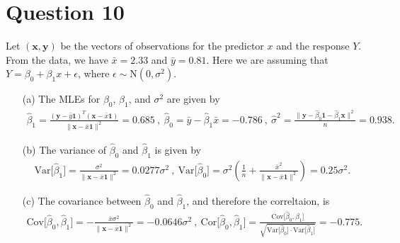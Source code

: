 \documentclass[10pt]{article}
\begin{document}
\section{Question 10} \noindent
Let \((\mathbf{x}, \mathbf{y})\) be the vectors of observations for the predictor \(x\) and the response \(Y\). 
From the data, we have \(\bar{x} = 2.33\) and \(\bar{y} = 0.81\).
Here we are assuming that \(Y = \beta_0 + \beta_1 x + \epsilon\), where \(\epsilon \sim \mathrm{N}(0, \sigma^2)\).
\begin{itemize}
    \item[(a)] The MLEs for \(\beta_0\), \(\beta_1\), and \(\sigma^2\) are given by 
    \begin{align*}
        \hat{\beta}_{1}
        = \frac{(\mathbf{y} - \bar{y}\mathbf{1})^T(\mathbf{x} - \bar{x}\mathbf{1})}{\| \mathbf{x} - \bar{x}\mathbf{1} \|^2}
        = 0.685
        ~,~
        \hat{\beta}_0
        = \bar{y} - \hat{\beta}_1 \bar{x}
        = -0.786
        ~,~
        \hat{\sigma}^2
        = \frac{\| \mathbf{y} - \hat{\beta}_0 \mathbf{1} - \hat{\beta}_1 \mathbf{x} \|^2}{n}
        = 0.938.
    \end{align*}
    \item[(b)] The variance of \(\hat{\beta}_0\) and \(\hat{\beta}_1\) is given by 
    \begin{align*}
        \mathrm{Var}\big[ \hat{\beta}_1 \big]
        = \frac{\sigma^2}{\| \mathbf{x} - \bar{x}\mathbf{1} \|^2}
        = 0.0277 \sigma^2
        ~,~
        \mathrm{Var}\big[ \hat{\beta}_0 \big]
        = \sigma^2 \left( \frac{1}{n} + \frac{\bar{x}^2}{\| \mathbf{x} - \bar{x}\mathbf{1} \|^2} \right)
        = 0.25 \sigma^2.
    \end{align*}
    \item[(c)] The covariance between \(\hat{\beta}_0\) and \(\hat{\beta}_1\), and therefore the correltaion, is 
    \begin{align*}
        \mathrm{Cov}\big[ \hat{\beta}_0, \hat{\beta}_1 \big]
        = - \frac{\bar{x} \sigma^2}{\| \mathbf{x} - \bar{x}\mathbf{1} \|^2}
        = -0.0646 \sigma^2
        ~,~
        \mathrm{Cor}\big[ \hat{\beta}_0, \hat{\beta}_1 \big] 
        = \frac{\mathrm{Cov}\big[ \hat{\beta}_0, \hat{\beta}_1 \big]}{\sqrt{\mathrm{Var}\big[ \hat{\beta}_0 \big] \cdot \mathrm{Var}\big[ \hat{\beta}_1 \big]}}
        = -0.775.
    \end{align*}
\end{itemize}
\end{document}
